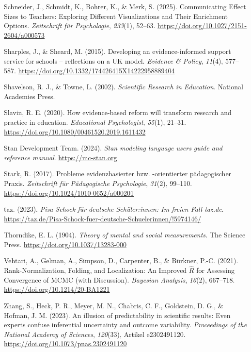\documentclass[
  jou,
  floatsintext,
  longtable,
  nolmodern,
  notxfonts,
  notimes,
  colorlinks=true,linkcolor=blue,citecolor=blue,urlcolor=blue]{apa7}
\newlength{\cslhangindent}
\newenvironment{CSLReferences}[2] %
 {\begin{list}{}{%
  \setlength{\itemindent}{0pt}
  \setlength{\leftmargin}{0pt}
  \setlength{\parsep}{0pt}
  \ifodd #1
   \setlength{\leftmargin}{\cslhangindent}
   \setlength{\itemindent}{-1\cslhangindent}
  \fi
  \setlength{\itemsep}{#2\baselineskip}}}
 {\end{list}}
\begin{document}
\begin{CSLReferences}{1}{0}
Schneider, J., Schmidt, K., Bohrer, K., \& Merk, S. (2025).
Communicating {Effect} {Sizes} to {Teachers}: {Exploring} {Different}
{Visualizations} and {Their} {Enrichment} {Options}. \emph{Zeitschrift
für Psychologie}, \emph{233}(1), 52--63.
\url{https://doi.org/10.1027/2151-2604/a000573}

Sharples, J., \& Sheard, M. (2015). Developing an evidence-informed
support service for schools -- reflections on a {UK} model.
\emph{Evidence \& Policy}, \emph{11}(4), 577--587.
\url{https://doi.org/10.1332/174426415X14222958889404}

Shavelson, R. J., \& Towne, L. (2002). \emph{Scientific Research in
Education}. National Academies Press.

Slavin, R. E. (2020). How evidence-based reform will transform research
and practice in education. \emph{Educational Psychologist},
\emph{55}(1), 21--31.
\url{https://doi.org/10.1080/00461520.2019.1611432}

Stan Development Team. (2024). \emph{Stan modeling language users guide
and reference manual}. \url{https://mc-stan.org}

Stark, R. (2017). Probleme evidenzbasierter bzw. -orientierter
pädagogischer Praxis. \emph{Zeitschrift für Pädagogische Psychologie},
\emph{31}(2), 99--110. \url{https://doi.org/10.1024/1010-0652/a000201}

taz. (2023). \emph{Pisa-Schock für deutsche Schü­le­r:in­nen: Im freien
Fall \textbar{} taz.de}.
\url{https://taz.de/Pisa-Schock-fuer-deutsche-Schuelerinnen/!5974146/}

Thorndike, E. L. (1904). \emph{Theory of mental and social
measurements.} The Science Press.
\url{https://doi.org/10.1037/13283-000}

Vehtari, A., Gelman, A., Simpson, D., Carpenter, B., \& Bürkner, P.-C.
(2021). Rank-Normalization, Folding, and Localization: An Improved
\(\widehat{R}\) for Assessing Convergence of MCMC (with Discussion).
\emph{Bayesian Analysis}, \emph{16}(2), 667--718.
\url{https://doi.org/10.1214/20-BA1221}

Zhang, S., Heck, P. R., Meyer, M. N., Chabris, C. F., Goldstein, D. G.,
\& Hofman, J. M. (2023). An illusion of predictability in scientific
results: Even experts confuse inferential uncertainty and outcome
variability. \emph{Proceedings of the National Academy of Sciences},
\emph{120}(33), Artikel e2302491120.
\url{https://doi.org/10.1073/pnas.2302491120}

\end{CSLReferences}
\end{document}
